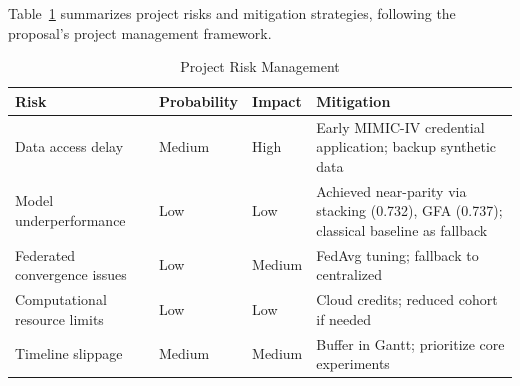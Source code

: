 Table~\ref{tab:risk} summarizes project risks and mitigation strategies, following the proposal's project management framework.

\begin{table}[htbp]
\centering
\caption{Project Risk Management}
\begin{tabular}{llll}
\toprule
Risk & Probability & Impact & Mitigation \\
\midrule
Data access delay & Medium & High & Early MIMIC-IV credential application; backup synthetic data \\
Model underperformance & Low & Low & Achieved near-parity via stacking (0.732), GFA (0.737); classical baseline as fallback \\
Federated convergence issues & Low & Medium & FedAvg tuning; fallback to centralized \\
Computational resource limits & Low & Low & Cloud credits; reduced cohort if needed \\
Timeline slippage & Medium & Medium & Buffer in Gantt; prioritize core experiments \\
\bottomrule
\end{tabular}
\label{tab:risk}
\end{table}
